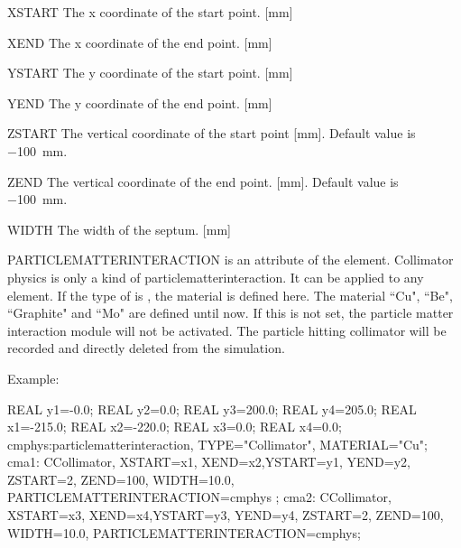 \begin{kdescription}
\item[XSTART]
The x coordinate of the start point. [\si{\milli\meter}]
 \item[XEND]
The x coordinate of the end point. [\si{\milli\meter}]
\item[YSTART]
The y coordinate of the start point. [\si{\milli\meter}]
 \item[YEND]
The y coordinate of the end point. [\si{\milli\meter}]
\item[ZSTART]
The vertical coordinate of the start point [\si{\milli\meter}]. Default value is \SI{-100}{\milli\meter}.
 \item[ZEND]
The vertical coordinate of the end point. [\si{\milli\meter}]. Default value is \SI{-100}{\milli\meter}.
\item[WIDTH]
The width of the septum. [\si{\milli\meter}]
 \item[PARTICLEMATTERINTERACTION]
 is an attribute of the element. Collimator physics is only a kind of particlematterinteraction.
 It can be applied to any element. If the type of  is , the material is defined here.
 The material ``Cu", ``Be", ``Graphite" and ``Mo" are defined until now.
 If this is not set, the particle matter interaction module will not be activated.
 The particle hitting collimator will be recorded and directly deleted from the simulation.
\end{kdescription}



\noindent Example:
\begin{example}
REAL y1=-0.0;
REAL y2=0.0;
REAL y3=200.0;
REAL y4=205.0;
REAL x1=-215.0;
REAL x2=-220.0;
REAL x3=0.0;
REAL x4=0.0;
cmphys:particlematterinteraction, TYPE="Collimator", MATERIAL="Cu";
cma1: CCollimator, XSTART=x1, XEND=x2,YSTART=y1, YEND=y2,
ZSTART=2, ZEND=100, WIDTH=10.0, PARTICLEMATTERINTERACTION=cmphys ;
cma2: CCollimator, XSTART=x3, XEND=x4,YSTART=y3, YEND=y4,
 ZSTART=2, ZEND=100, WIDTH=10.0, PARTICLEMATTERINTERACTION=cmphys;
\end{example}

